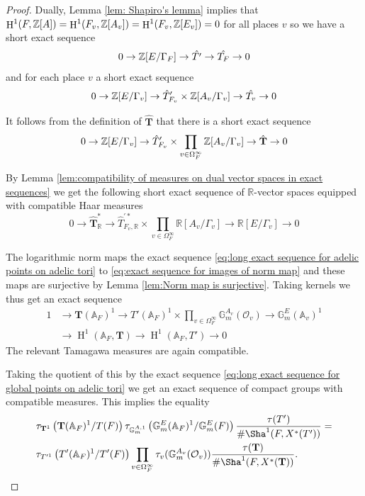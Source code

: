 \documentclass[a4paper,11pt,reqno]{amsart}
\newcommand{\R}{\mathbb{R}}
\newcommand{\G}{\mathbb{G}}
\newcommand{\A}{\mathbb{A}}
\DeclareMathOperator{\HH}{H}
\theoremstyle{definition}
\begin{document}
\begin{proof}
	Dually, Lemma \ref{lem: Shapiro's lemma} implies that $\HH^1(F, \Z[A]) = \HH^1(F_v, \Z[A_v]) = \HH^1(F_v, \Z[E_v]) = 0$ for all places $v$ so we have a short exact sequence 
	\[
	0 \to \mathbb{Z}[E / \Gamma_F] \to \hat{T'} \to \hat{T_F} \to 0
	\]
	and for each place $v$ a short exact sequence 
	\[
	0 \to \mathbb{Z}[E / \Gamma_v] \to \hat{T}'_{F_v} \times \mathbb{Z}[A_v / \Gamma_v] \to \hat{T_v} \to 0
	\]
	
	It follows from the definition of $\hat{\mathbf{T}}$ that there is a short exact sequence
	\[
	0 \to \mathbb{Z}[E / \Gamma_v] \to \hat{T}'_{F_v} \times \prod_{v \in \Omega_{F}^{\infty}} \mathbb{Z}[A_v / \Gamma_v] \to \hat{\mathbf{T}} \to 0
	\] 
	
	By Lemma \ref{lem:compatibility of measures on dual vector spaces in exact sequences} we get the following short exact sequence of $\R$-vector spaces equipped with compatible Haar measures 
	\begin{equation}\label{eq:exact sequence for images of norm map}
	0 \to \hat{\mathbf{T}}_{\R}^* \to \hat{T}^{'*}_{F_v, \R} \times \prod_{v \in \Omega_{F}^{\infty}} \R[A_v / \Gamma_v] \to \R[E / \Gamma_v] \to 0
	\end{equation}
	
	The logarithmic norm maps the exact sequence \eqref{eq:long exact sequence for adelic points on adelic tori} to \eqref{eq:exact sequence for images of norm map} and these maps are surjective by Lemma \ref{lem:Norm map is surjective}. Taking kernels we thus get an exact sequence
	\[
	\begin{split}
		1 &\to \mathbf{T}(\A_F)^1 \to T'(\A_F)^1 \times \prod_{v \in \Omega_F^{\infty}} \G_m^{A_v}(\mathcal{O}_v) \to \G_m^{E}(\A_v)^1 \\ &\to \HH^1(\A_F, \mathbf{T}) \to \HH^1(\A_F, T') \to 0
	\end{split}
	\]
	The relevant Tamagawa measures are again compatible.
	
	Taking the quotient of this by the exact sequence \eqref{eq:long exact sequence for global points on adelic tori} we get an exact sequence of compact groups with compatible measures. This implies the equality
	\begin{equation*}
		\begin{split}
			&\tau_{\mathbf{T}^1}\left(\mathbf{T}(\A_F)^1/T(F)\right) \tau_{\G_m^{A,1}}\left(\G_m^E(\A_F)^1/\G_m^E(F)\right) \frac{\tau(T')}{\# \Sha^1(F, X^*(T'))} = \\
			&\tau_{T'^1}\left(T'(\A_F)^1/T'(F)\right) \prod_{v \in \Omega_F^{\infty}} \tau_v(\G_m^{A_v}(\mathcal{O}_v)) \frac{\tau(\mathbf{T})}{\# \Sha^1(F, X^*(\mathbf{T}))}.
		\end{split}
	\end{equation*}


\end{proof}
\end{document}
